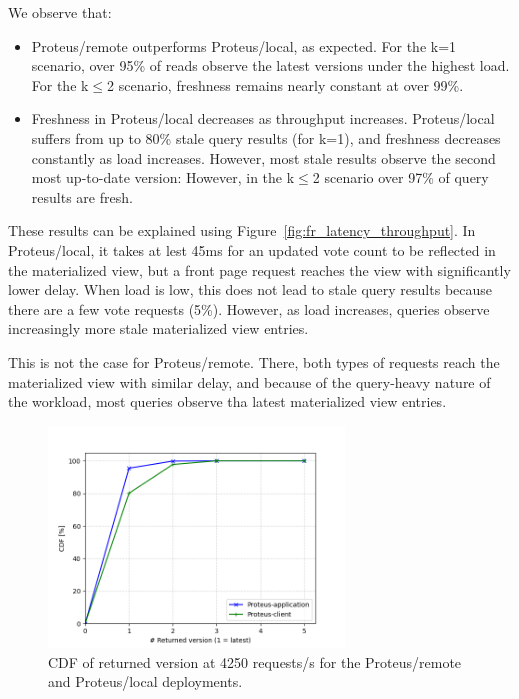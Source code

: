 We observe that:
\begin{itemize}
  \item Proteus/remote outperforms Proteus/local, as expected.
  For the k=1 scenario, over 95\% of reads observe the latest versions under the highest load.
  For the k$\leq$2 scenario, freshness remains nearly constant at over 99\%.
  \item Freshness in Proteus/local decreases as throughput increases.
  Proteus/local suffers from up to 80\% stale query results (for k=1), and freshness decreases constantly as load increases.
  However, most stale results observe the second most up-to-date version:
  However, in the k$\leq$2 scenario over 97\% of query results are fresh.
\end{itemize}

These results can be explained using Figure~\ref{fig:fr_latency_throughput}.
In Proteus/local, it takes at lest 45ms for an updated vote count to be reflected in the materialized view,
but a front page request reaches the view with significantly lower delay.
When load is low, this does not lead to stale query results because there are a few vote requests (5\%).
However, as load increases, queries observe increasingly more stale materialized view  entries.

This is not the case for Proteus/remote.
There, both types of requests reach the materialized view with similar delay,
and because of the query-heavy nature of the workload,
most queries observe tha latest materialized view entries.

\begin{figure}[H]
\centering
  \includegraphics[width=0.7\textwidth]{./figures/evaluation/readV_cdf_throughput.png}
  \caption{CDF of returned version at 4250 requests/s for the Proteus/remote and Proteus/local deployments.}
  \label{fig:readV_cdf_throughput}
\end{figure}

